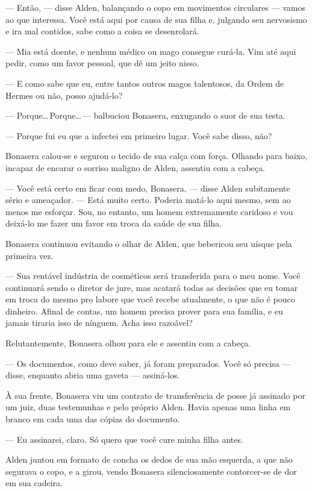 --- Então, --- disse Alden, balançando o copo em movimentos circulares ---
vamos ao que interessa. Você está aqui por causa de sua filha e, julgando seu
nervosismo e ira mal contidos, sabe como a coisa se desenrolará.

--- Mia está doente, e nenhum médico ou mago consegue curá-la. Vim até aqui
pedir, como um favor pessoal, que dê um jeito nisso.

--- E como sabe que eu, entre tantos outros magos talentosos, da Ordem de
Hermes ou não, posso ajudá-lo?

--- Porque\ldots\,Porque\ldots\,--- balbuciou Bonasera, enxugando o suor de sua
testa.

--- Porque fui eu que a infectei em primeiro lugar. Você sabe disso, não?

Bonasera calou-se e segurou o tecido de sua calça com força. Olhando para
baixo, incapaz de encarar o sorriso maligno de Alden, assentiu com a cabeça.

--- Você está certo em ficar com medo, Bonasera. --- disse Alden subitamente
sério e ameaçador. --- Está muito certo. Poderia matá-lo aqui mesmo, sem ao
menos me esforçar. Sou, no entanto, um homem extremamente caridoso e vou
deixá-lo me fazer um favor em troca da saúde de sua filha.

Bonasera continuou evitando o olhar de Alden, que bebericou seu uísque pela
primeira vez.

--- Sua rentável indústria de cosméticos será transferida para o meu nome. Você
continuará sendo o diretor de jure, mas acatará todas as decisões que eu tomar
em troca do mesmo pro labore que você recebe atualmente, o que não é pouco
dinheiro. Afinal de contas, um homem precisa prover para sua família, e eu
jamais tiraria isso de nínguem. Acha isso razoável?

Relutantemente, Bonasera olhou para ele e assentiu com a cabeça.

--- Os documentos, como deve saber, já foram preparados. Você só precisa ---
disse, enquanto abria uma gaveta --- assiná-los.

À sua frente, Bonasera viu um contrato de transferência de posse já assinado
por um juiz, duas testemunhas e pelo próprio Alden. Havia apenas uma linha em
branco em cada uma das cópias do documento.

--- Eu assinarei, claro. Só quero que você cure minha filha antes.

Alden juntou em formato de concha os dedos de sua mão esquerda, a que não
segurava o copo, e a girou, vendo Bonasera silenciosamente contorcer-se de dor
em sua cadeira.

